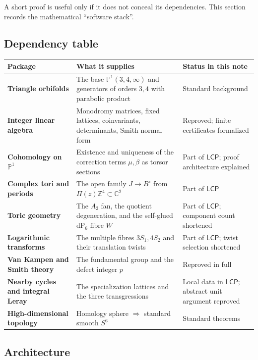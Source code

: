 \documentclass[11pt,reqno]{amsart}
\numberwithin{equation}{section}
\newcommand{\Z}{\mathbb Z}
\newcommand{\C}{\mathbb C}
\newcommand{\Pone}{\mathbb P^1}
\newcommand{\dP}{\mathrm{dP}_6}
\newcommand{\LCP}{\mathsf{LCP}}
\theoremstyle{definition}
\begin{document}
A short proof is useful only if it does not conceal its dependencies. This section records the mathematical ``software stack''.

\subsection{Dependency table}

\begin{center}
\small
\begin{tabularx}{\textwidth}{@{}>{\raggedright\arraybackslash\bfseries}p{}X>{\raggedright\arraybackslash}p{}@{}}
\toprule
Package & What it supplies & Status in this note\\
\midrule
Triangle orbifolds & The base $\Pone(3,4,\infty)$ and generators of orders $3,4$ with parabolic product & Standard background\\
Integer linear algebra & Monodromy matrices, fixed lattices, coinvariants, determinants, Smith normal form & Reproved; finite certificates formalized\\
Cohomology on $\Pone$ & Existence and uniqueness of the correction terms $\mu,\beta$ as torsor sections & Part of $\LCP$; proof architecture explained\\
Complex tori and periods & The open family $J\to B^\circ$ from $\Pi(z)\Z^4\subset\C^2$ & Part of $\LCP$\\
Toric geometry & The $A_2$ fan, the quotient degeneration, and the self-glued $\dP$ fibre $W$ & Part of $\LCP$; component count shortened\\
Logarithmic transforms & The multiple fibres $3S_1,4S_2$ and their translation twists & Part of $\LCP$; twist selection shortened\\
Van Kampen and Smith theory & The fundamental group and the defect integer $p$ & Reproved in full\\
Nearby cycles and integral Leray & The specialization lattices and the three transgressions & Local data in $\LCP$; abstract unit argument reproved\\
High-dimensional topology & Homology sphere $\Rightarrow$ standard smooth $S^6$ & Standard theorems\\
\bottomrule
\end{tabularx}
\end{center}

\subsection{Architecture}
\end{document}
